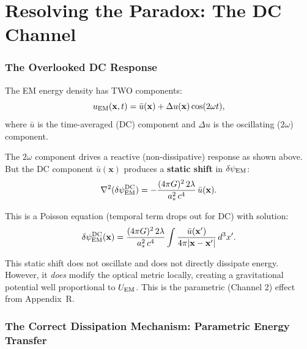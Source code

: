 \documentclass[11pt]{article}
\newcommand{\dpsiEM}{\delta\psi_{\rm EM}}
\theoremstyle{definition}
\theoremstyle{remark}
\begin{document}
\part{Resolving the Paradox: The DC Channel}
\label{part:resolution}


\section{The Overlooked DC Response}
\label{sec:dc}

The EM energy density has TWO components:
\begin{equation}
u_{\rm EM}(\mathbf{x}, t) = \bar{u}(\mathbf{x})
+ \Delta u(\mathbf{x})\cos(2\omega t),
\end{equation}
where $\bar{u}$ is the time-averaged (DC) component and $\Delta u$
is the oscillating ($2\omega$) component.

The $2\omega$ component drives a reactive (non-dissipative) response
as shown above. But the DC component $\bar{u}(\mathbf{x})$ produces
a \textbf{static shift} in $\dpsiEM$:
\begin{equation}
\nabla^2(\dpsiEM^{\rm DC}) = -\frac{(4\pi G)^2\,2\lambda}
{a_*^2\,c^4}\,\bar{u}(\mathbf{x}).
\end{equation}

This is a Poisson equation (temporal term drops out for DC) with
solution:
\begin{equation}
\dpsiEM^{\rm DC}(\mathbf{x}) = \frac{(4\pi G)^2\,2\lambda}
{a_*^2\,c^4}\int \frac{\bar{u}(\mathbf{x}')}{4\pi|\mathbf{x}
- \mathbf{x}'|}\,d^3x'.
\end{equation}

This static shift does not oscillate and does not directly dissipate
energy. However, it \emph{does} modify the optical metric locally,
creating a gravitational potential well proportional to $U_{\rm EM}$.
This is the parametric (Channel 2) effect from Appendix~R.


\section{The Correct Dissipation Mechanism: Parametric Energy Transfer}
\label{sec:parametric}
\end{document}
